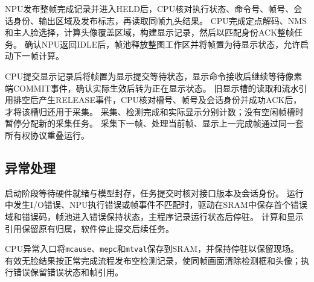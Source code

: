 NPU发布整帧完成记录并进入HELD后，CPU核对执行状态、命令号、帧号、会话身份、输出区域及发布标志，再读取同帧九头结果。
CPU完成定点解码、NMS和主人脸选择，计算头像覆盖区域，构建显示记录，然后以匹配身份ACK整帧任务。
确认NPU返回IDLE后，帧池释放整图工作区并将帧置为待显示状态，允许启动下一帧计算。

CPU提交显示记录后将帧置为显示提交等待状态，显示命令接收后继续等待像素端COMMIT事件，确认实际生效后转为正在显示状态。
旧显示槽的读取和流水引用排空后产生RELEASE事件，CPU核对槽号、帧号及会话身份并成功ACK后，才将该槽归还用于采集。
采集、检测完成和实际显示分别计数；没有空闲帧槽时暂停分配新的采集任务。
采集下一帧、处理当前帧、显示上一完成帧通过同一套所有权协议重叠运行。

\subsection{异常处理}

启动阶段等待硬件就绪与模型封存，任务提交时核对接口版本及会话身份。
运行中发生I/O错误、NPU执行错误或帧事件不匹配时，驱动在SRAM中保存首个错误域和错误码，帧池进入错误保持状态，主程序记录运行状态后停驻。
计算和显示引用保留原有归属，软件停止提交后续任务。

CPU异常入口将\texttt{mcause}、\texttt{mepc}和\texttt{mtval}保存到SRAM，并保持停驻以保留现场。
有效无脸结果按正常完成流程发布空检测记录，使同帧画面清除检测框和头像；执行错误保留错误状态和帧引用。

